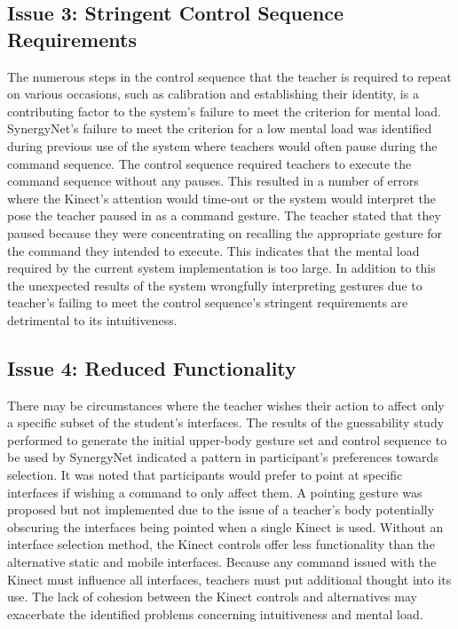 \documentclass[manuscript, review, screen]{acmart}
\begin{document}
\subsection*{Issue 3: Stringent Control Sequence Requirements}

The numerous steps in the control sequence that the teacher is required to repeat on various occasions, such as calibration and establishing their identity, is a contributing factor to the system's failure to meet the criterion for mental load.
SynergyNet's failure to meet the criterion for a low mental load was identified during previous use of the system where teachers would often pause during the command sequence.
The control sequence required teachers to execute the command sequence without any pauses.
This resulted in a number of errors where the Kinect's attention would time-out or the system would interpret the pose the teacher paused in as a command gesture.
The teacher stated that they paused because they were concentrating on recalling the appropriate gesture for the command they intended to execute.
This indicates that the mental load required by the current system implementation is too large.
In addition to this the unexpected results of the system wrongfully interpreting gestures due to teacher's failing to meet the control sequence's stringent requirements are detrimental to its intuitiveness.

\subsection*{Issue 4: Reduced Functionality}

There may be circumstances where the teacher wishes their action to affect only a specific subset of the student's interfaces.
The results of the guessability study performed to generate the initial upper-body gesture set and control sequence to be used by SynergyNet indicated a pattern in participant's preferences towards selection.
It was noted that participants would prefer to point at specific interfaces if wishing a command to only affect them.
A pointing gesture was proposed but not implemented due to the issue of a teacher's body potentially obscuring the interfaces being pointed when a single Kinect is used.
Without an interface selection method, the Kinect controls offer less functionality than the alternative static and mobile interfaces.
Because any command issued with the Kinect must influence all interfaces, teachers must put additional thought into its use.
The lack of cohesion between the Kinect controls and alternatives may exacerbate the identified problems concerning intuitiveness and mental load.
\end{document}
